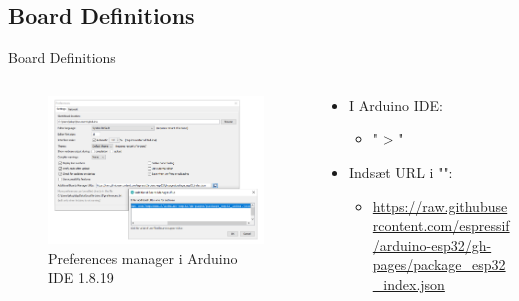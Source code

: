 \documentclass[aspectratio=169]{beamer}
\begin{document}
\subsection{Board Definitions}
\begin{frame}{Board Definitions}
\begin{columns}
	\begin{column}{0.5\textwidth}
		\begin{figure}
  			\includegraphics[width=\textwidth]{assets/pictures/boardsmanager.png}
  			\caption{Preferences manager i Arduino IDE 1.8.19}
  			\label{fig:boardmanager}
		\end{figure}
	\end{column}
	\begin{column}{0.5\textwidth}
		\begin{textBox}
			\begin{itemize}
				\item I Arduino IDE:
				\begin{itemize}
					 \item " > "
				\end{itemize}
				\item Indsæt URL i "":
				\begin{itemize}
					 \item \tiny\url{https://raw.githubusercontent.com/espressif/arduino-esp32/gh-pages/package_esp32_index.json}
				\end{itemize}
			\end{itemize}
		\end{textBox}
	\end{column}
\end{columns}
\end{frame}
\end{document}
